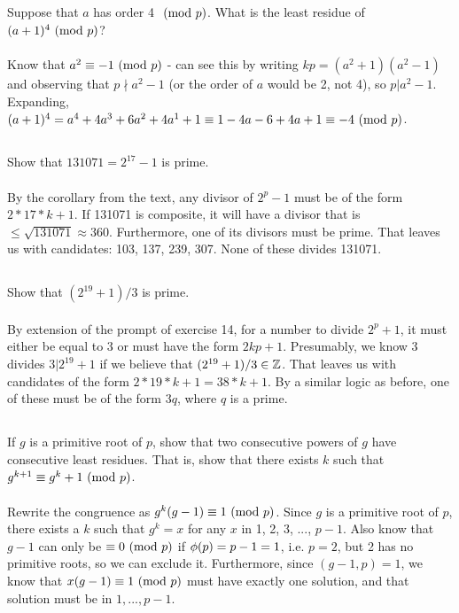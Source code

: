 \documentclass{article} \usepackage{amsmath}
\begin{document}
\subsection{}
Suppose that $a$ has order 4 $\ (\mathrm{mod}\ p)$.
What is the least residue of $(a + 1)^4 \ (\mathrm{mod}\ p)$?\\~\\
Know that $a^2 \equiv -1 \ (\mathrm{mod}\ p)$ - can see this by writing
$kp = (a^2 + 1)(a^2 - 1)$ and observing that $p \nmid a^2 - 1$
(or the order of $a$ would be 2, not 4), so $p|a^2 - 1$.
Expanding, $(a + 1)^4 = a^4 + 4a^3 + 6a^2 + 4a^1 + 1 \equiv
1 - 4a - 6 + 4a + 1 \equiv -4 \ (\mathrm{mod}\ p)$.

\subsection{}
Show that $131071 = 2^{17} - 1$ is prime.\\~\\
By the corollary from the text, any divisor of $2^p - 1$ must be of the form
$2*17*k + 1$.
If 131071 is composite, it will have a divisor that is
$\leq \sqrt{131071} \approx 360$.
Furthermore, one of its divisors must be prime.
That leaves us with candidates: 103, 137, 239, 307.
None of these divides 131071.

\subsection{}
Show that $(2^{19} + 1)/3$ is prime.\\~\\
By extension of the prompt of exercise 14, for a number to divide
$2^p + 1$, it must either be equal to 3 or must have the form $2kp + 1$.
Presumably, we know 3 divides $3|2^{19} + 1$ if we believe that
$(2^{19} + 1)/3 \in \mathbb{Z}$.
That leaves us with candidates of the form $2 * 19 * k + 1 = 38 * k + 1$.
By a similar logic as before, one of these must be of the form $3q$,
where $q$ is a prime.

\subsection{}
If $g$ is a primitive root of $p$, show that two consecutive powers of $g$
have consecutive least residues. That is, show that there exists $k$ such that
$g^{k + 1} \equiv g^k + 1 \ (\mathrm{mod}\ p)$.\\~\\
Rewrite the congruence as $g^k(g - 1) \equiv 1 \ (\mathrm{mod}\ p)$.
Since $g$ is a primitive root of $p$, there exists a $k$ such that
$g^k = x$ for any $x$ in 1, 2, 3, ..., $p - 1$.
Also know that $g - 1$ can only be $\equiv 0 \ (\mathrm{mod}\ p)$ if $\phi(p) = p - 1 = 1$,
i.e. $p = 2$, but 2 has no primitive roots, so we can exclude it.
Furthermore, since $(g - 1, p) = 1$, we know that $x(g - 1) \equiv 1 \ (\mathrm{mod}\ p)$
must have exactly one solution, and that solution must be in $1, ..., p - 1$.
\end{document}
